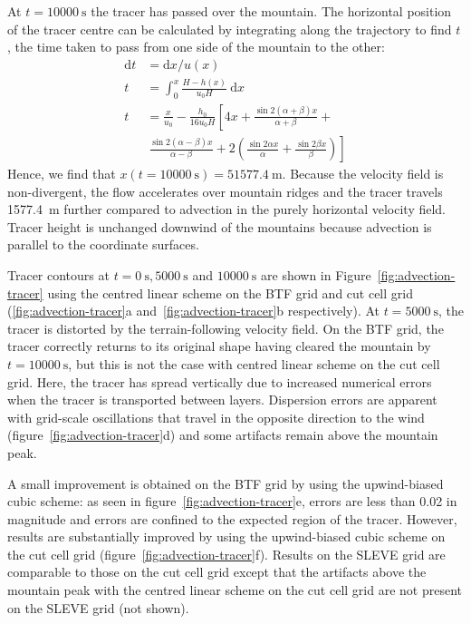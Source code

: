 \documentclass{ametsoc}
\begin{document}
At $t = \SI{10000}{\second}$ the tracer has passed over the mountain.  The horizontal position of the tracer centre can be calculated by integrating along the trajectory to find $t$, the time taken to pass from one side of the mountain to the other:
\begin{align}
	\mathrm{d}t &= \mathrm{d}x / u(x) \\
	t &= \int_0^x \frac{H - h(x)}{u_0 H}\:\mathrm{d}x \\
	t &= \frac{x}{u_0} - \frac{h_0}{16 u_0 H} \left[ 4x + \frac{\sin 2 (\alpha + \beta) x}{\alpha + \beta} \right.+ \nonumber \\
   &\ \left. \frac{\sin 2(\alpha - \beta) x}{\alpha - \beta} + 2 \left( \frac{\sin 2\alpha x}{\alpha} + \frac{\sin 2\beta x}{\beta} \right) \right]
\end{align}
Hence, we find that \(x(t=\SI{10000}{\second}) = \SI{51577.4}{\meter}\).  Because the velocity field is non-divergent, the flow accelerates over mountain ridges and the tracer travels \SI{1577.4}{\meter} further compared to advection in the purely horizontal velocity field.  Tracer height is unchanged downwind of the mountains because advection is parallel to the coordinate surfaces.

Tracer contours at \(t = \SI{0}{\second}, \SI{5000}{\second}\) and \(\SI{10000}{\second}\) are shown in Figure~\ref{fig:advection-tracer} using the centred linear scheme on the BTF grid and cut cell grid (\ref{fig:advection-tracer}a and~\ref{fig:advection-tracer}b respectively).
At \(t = \SI{5000}{\second}\), the tracer is distorted by the terrain-following velocity field.  On the BTF grid, the tracer correctly returns to its original shape having cleared the mountain by \(t = \SI{10000}{\second}\), but this is not the case with centred linear scheme on the cut cell grid.  Here, the tracer has spread vertically due to increased numerical errors when the tracer is transported between layers.
Dispersion errors are apparent with grid-scale oscillations that travel in the opposite direction to the wind (figure~\ref{fig:advection-tracer}d) and some artifacts remain above the mountain peak.

A small improvement is obtained on the BTF grid by using the upwind-biased cubic scheme: as seen in figure~\ref{fig:advection-tracer}e, errors are less than \num{0.02} in magnitude and errors are confined to the expected region of the tracer.
However, results are substantially improved by using the upwind-biased cubic scheme on the cut cell grid (figure~\ref{fig:advection-tracer}f).
Results on the SLEVE grid are comparable to those on the cut cell grid except that the artifacts above the mountain peak with the centred linear scheme on the cut cell grid are not present on the SLEVE grid (not shown).
\end{document}
